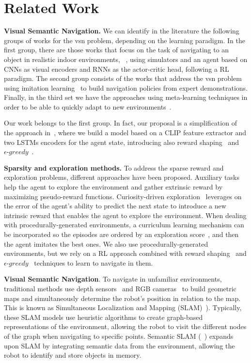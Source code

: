 \chapter{Related Work}\label{ch:related-work}

\textbf{Visual Semantic Navigation.} We can identify in the literature the following groups of works for the \acrshort{vsn} problem, depending on the learning paradigm.
In the first group, there are those works that focus on the task of navigating to an object in realistic indoor environments, \eg~\cite{zhu2017, wijmans2020, chang2020, khandelwal2022}, using simulators and an agent based on CNNs as visual encoders and RNNs as the actor-critic head, following a RL paradigm.
The second group consists of the works that address the \acrshort{vsn} problem using imitation learning~\cite{wu2020a, ramrakhya2022} to build navigation policies from expert demonstrations.
Finally, in the third set we have the approaches using meta-learning techniques in order to be able to quickly adapt to new environments~\cite{wang2017, wortsman2019, zhang2022}.

Our work belongs to the first group.
In fact, our proposal is a simplification of the approach in~\cite{khandelwal2022}, where we build a model based on a CLIP feature extractor and two LSTMs encoders for the agent state, introducing also reward shaping~\cite{wijmans2020} and $\epsilon\text{-}greedy$~\cite{mnih2013}.

\textbf{Sparsity and exploration methods.} To address the sparse reward and exploration problems, different approaches have been proposed.
Auxiliary tasks~\cite{jaderberg2016, ye2021} help the agent to explore the environment and gather extrinsic reward by maximizing pseudo-reward functions.
Curiosity-driven exploration~\cite{pathak2017} leverages on the error of the agent's ability to predict the next state to introduce a new intrinsic reward that enables the agent to explore the environment.
When dealing with procedurally-generated environments, a curriculum learning mechanism can be incorporated so the episodes are ordered by an exploration score~\cite{zha2020b}, and then the agent imitates the best ones.
We also use procedurally-generated environments, but we rely on a RL approach combined with reward shaping~\cite{ng1999, jestel2021} and $\epsilon\text{-}greedy$~\cite{mnih2013} techniques to learn to navigate in them.


\textbf{Visual Semantic Navigation}.
To navigate in unfamiliar environments, traditional methods use depth sensors~\cite{newcombe2011, thrun2001} and RGB cameras~\cite{jones2011, sattler2018} to build geometric maps and simultaneously determine the robot's position in relation to the map.
This is known as Simultaneous Localization and Mapping (SLAM)~\cite{Kazerouni2022, campos2021, labbe2022}).
Typically, these SLAM models use heuristic algorithms to create graph-based representations of the environment, allowing the robot to visit the different nodes of the graph when navigating to specific points.
Semantic SLAM (\eg~\cite{zhang2018, rosinol2020, jin2023}) expands upon SLAM by integrating semantic data from the environment, allowing the robot to identify and store objects in memory.

